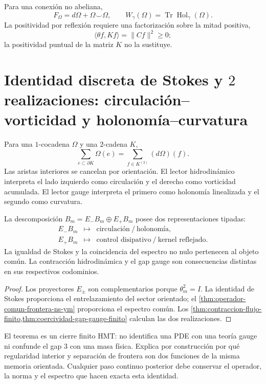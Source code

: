 Para una conexión no abeliana,
\[
 F_\Omega=d\Omega+\Omega\smile\Omega,
\qquad
 W_\gamma(\Omega)=\operatorname{Tr}\operatorname{Hol}_\gamma(\Omega).
\]
La positividad por reflexión requiere una factorización sobre la mitad
positiva,
\[
 \langle\theta f,Kf\rangle=\|Cf\|^2\geq0;
\]
la positividad puntual de la matriz \(K\) no la sustituye.

\section[Identidad de Stokes: circulación--vorticidad y holonomía--curvatura]{Identidad discreta de Stokes y \(2\) realizaciones: circulación--vorticidad y holonomía--curvatura}

Para una \(1\)-cocadena \(\Omega\) y una \(2\)-cadena \(K\),
\[
 \sum_{e\subset\partial K}\Omega(e)
 =
 \sum_{f\in K^{(2)}}(d\Omega)(f).
\]
Las aristas interiores se cancelan por orientación. El lector
hidrodinámico interpreta el lado izquierdo como circulación y el derecho
como vorticidad acumulada. El lector gauge interpreta el primero como
holonomía linealizada y el segundo como curvatura.

\begin{theorem}
\label{thm:hoja-comun-frontera}
La descomposición \(B_m=E_-B_m\oplus E_+B_m\) posee dos representaciones
tipadas:
\[
\boxed{
\begin{array}{ccl}
E_-B_m&\longmapsto&
\text{circulación}\ /\ \text{holonomía},\\[2mm]
E_+B_m&\longmapsto&
\text{control disipativo}\ /\ \text{kernel reflejado}.
\end{array}}
\]
La igualdad de Stokes y la coincidencia del espectro no nulo pertenecen al
objeto común. La contracción hidrodinámica y el gap gauge son consecuencias
distintas en sus respectivos codominios.
\end{theorem}

\begin{proof}
Los proyectores \(E_\pm\) son complementarios porque
\(\theta_m^2=I\). La identidad de Stokes proporciona el entrelazamiento del
sector orientado; el \cref{thm:operador-comun-frontera-ns-ym} proporciona el
espectro común. Los
\cref{thm:contraccion-flujo-finito,thm:coercividad-gap-gauge-finito}
calculan las dos realizaciones.
\end{proof}

El teorema es un cierre finito HMT: no identifica una PDE con una teoría
gauge ni confunde el gap \(3\) con una masa física. Explica por construcción
por qué regularidad interior y separación de frontera son dos funciones de
la misma memoria orientada. Cualquier paso continuo posterior debe conservar
el operador, la norma y el espectro que hacen exacta esta identidad.
\endgroup
